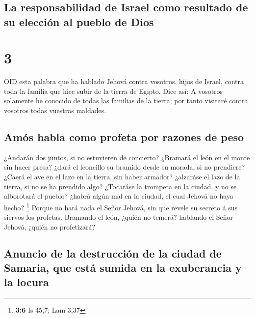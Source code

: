 \hypertarget{la-responsabilidad-de-israel-como-resultado-de-su-elecciuxf3n-al-pueblo-de-dios}{%
\subsection{La responsabilidad de Israel como resultado de su elección
al pueblo de
Dios}\label{la-responsabilidad-de-israel-como-resultado-de-su-elecciuxf3n-al-pueblo-de-dios}}

\hypertarget{section-2}{%
\section{3}\label{section-2}}

 OID esta palabra que ha hablado Jehová contra vosotros,
hijos de Israel, contra toda la familia que hice subir de la tierra de
Egipto. Dice así:  A vosotros solamente he conocido de todas
las familias de la tierra; por tanto visitaré contra vosotros todas
vuestras maldades.

\hypertarget{amuxf3s-habla-como-profeta-por-razones-de-peso}{%
\subsection{Amós habla como profeta por razones de
peso}\label{amuxf3s-habla-como-profeta-por-razones-de-peso}}

 ¿Andarán dos juntos, si no estuvieren de concierto?
 ¿Bramará el león en el monte sin hacer presa? ¿dará el
leoncillo su bramido desde su morada, si no prendiere? 
¿Caerá el ave en el lazo en la tierra, sin haber armador? ¿alzaráse el
lazo de la tierra, si no se ha prendido algo?  ¿Tocaráse la
trompeta en la ciudad, y no se alborotará el pueblo? ¿habrá algún mal en
la ciudad, el cual Jehová no haya hecho? \footnote{\textbf{3:6} Is 45,7;
  Lam 3,37}  Porque no hará nada el Señor Jehová, sin que
revele su secreto á sus siervos los profetas.  Bramando el
león, ¿quién no temerá? hablando el Señor Jehová, ¿quién no profetizará?

\hypertarget{anuncio-de-la-destrucciuxf3n-de-la-ciudad-de-samaria-que-estuxe1-sumida-en-la-exuberancia-y-la-locura}{%
\subsection{Anuncio de la destrucción de la ciudad de Samaria, que está
sumida en la exuberancia y la
locura}\label{anuncio-de-la-destrucciuxf3n-de-la-ciudad-de-samaria-que-estuxe1-sumida-en-la-exuberancia-y-la-locura}}

